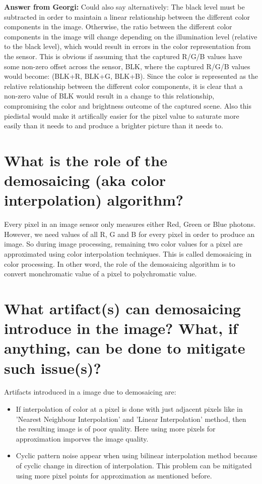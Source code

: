 \documentclass{article}
\begin{document}
\textbf{Answer from Georgi: } Could also say alternatively: The black level must be subtracted in order to maintain a linear relationship between 
the different color components in the image. Otherwise, the ratio between the different 
color components in the image will change depending on the illumination level (relative 
to the black level), which would result in errors in the color representation from 
the sensor. This is obvious if assuming that the captured R/G/B values have some 
non-zero offset across the sensor, BLK, where the captured R/G/B values would become:
(BLK+R, BLK+G, BLK+B). Since the color is represented as the relative relationship 
between the different color components, it is clear that a non-zero value of BLK would 
result in a change to this relationship, compromising the color and brightness outcome 
of the captured scene. Also this piedistal would make it artifically easier for the 
pixel value to saturate more easily than it needs to and produce a brighter picture 
than it needs to.


\section{What is the role of the demosaicing (aka color interpolation) 
algorithm?}
Every pixel in an image sensor only measures either Red, Green or Blue photons. 
However, we need values of all R, G and B for every pixel in order to produce an 
image. So during image processing, remaining two color values for a pixel are 
approximated using color interpolation techniques. This is called demosaicing in 
color processing. In other word, the role of the demosaicing algorithm is to convert 
monchromatic value of a pixel to polychromatic value. 

\section{What artifact(s) can demosaicing introduce in the image? What, 
if anything, can be done to mitigate such issue(s)?}
Artifacts introduced in a image due to  demosaicing are:
\begin{itemize}
\item If interpolation of color at a pixel is done with just adjacent pixels like in 
'Nearest Neighbour Interpolation' and 'Linear Interpolation' method, then the 
resulting image is of poor quality. \newline 
\noindent Here using more pixels for approximation imporves the image quality.
\item Cyclic pattern noise appear when using bilinear interpolation method because of 
cyclic change in direction of interpolation. \newline
\noindent This problem can be mitigated using more pixel points for approximation as 
mentioned before.
\end{itemize} 
\end{document}
